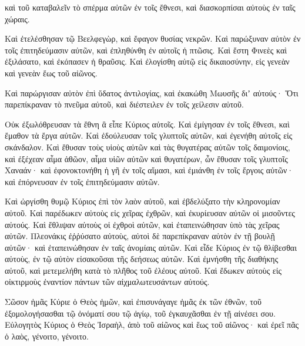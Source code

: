 {καὶ τοῦ καταβαλεῖν τὸ σπέρμα αὐτῶν ἐν τοῖς ἔθνεσι, καὶ διασκορπίσαι αὐτοὺς ἐν ταῖς χώραις.
\par }{\PP {}Καὶ ἐτελέσθησαν τῷ Βεελφεγὼρ, καὶ ἔφαγον θυσίας νεκρῶν.
Καὶ παρώξυναν αὐτὸν ἐν τοῖς ἐπιτηδεύμασιν αὐτῶν, καὶ ἐπληθύνθη ἐν αὐτοῖς ἡ πτῶσις.
Καὶ ἔστη Φινεὲς καὶ ἐξιλάσατο, καὶ ἐκόπασεν ἡ θραῦσις.
Καὶ ἐλογίσθη αὐτῷ εἰς δικαιοσύνην, εἰς γενεὰν καὶ γενεὰν ἕως τοῦ αἰῶνος.
\par }{\PP {}Καὶ παρώργισαν αὐτὸν ἐπὶ ὕδατος ἀντιλογίας, καὶ ἐκακώθη Μωυσῆς διʼ αὐτούς·
Ὅτι παρεπίκραναν τὸ πνεῦμα αὐτοῦ, καὶ διέστειλεν ἐν τοῖς χείλεσιν αὐτοῦ.
\par }{\PP {}Οὐκ ἐξωλόθρευσαν τὰ ἔθνη ἃ εἶπε Κύριος αὐτοῖς.
Καὶ ἐμίγησαν ἐν τοῖς ἔθνεσι, καὶ ἔμαθον τὰ ἔργα αὐτῶν.
Καὶ ἐδούλευσαν τοῖς γλυπτοῖς αὐτῶν, καὶ ἐγενήθη αὐτοῖς εἰς σκάνδαλον.
Καὶ ἔθυσαν τοὺς υἱοὺς αὐτῶν καὶ τὰς θυγατέρας αὐτῶν τοῖς δαιμονίοις,
καὶ ἐξέχεαν αἷμα ἀθῶον, αἷμα υἱῶν αὐτῶν καὶ θυγατέρων, ὧν ἔθυσαν τοῖς γλυπτοῖς Χαναάν· καὶ ἐφονοκτονήθη ἡ γῆ ἐν τοῖς αἵμασι,
καὶ ἐμιάνθη ἐν τοῖς ἔργοις αὐτῶν· καὶ ἐπόρνευσαν ἐν τοῖς ἐπιτηδεύμασιν αὐτῶν.
\par }{\PP {}Καὶ ὠργίσθη θυμῷ Κύριος ἐπὶ τὸν λαὸν αὐτοῦ, καὶ ἐβδελύξατο τὴν κληρονομίαν αὐτοῦ.
Καὶ παρέδωκεν αὐτοὺς εἰς χεῖρας ἐχθρῶν, καὶ ἐκυρίευσαν αὐτῶν οἱ μισοῦντες αὐτούς.
Καὶ ἔθλιψαν αὐτοὺς οἱ ἐχθροὶ αὐτῶν, καὶ ἐταπεινώθησαν ὑπὸ τὰς χεῖρας αὐτῶν.
Πλεονάκις ἐῤῥύσατο αὐτοὺς, αὐτοὶ δὲ παρεπίκραναν αὐτὸν ἐν τῇ βουλῇ αὐτῶν· καὶ ἐταπεινώθησαν ἐν ταῖς ἀνομίαις αὐτῶν.
Καὶ εἶδε Κύριος ἐν τῷ θλίβεσθαι αὐτοὺς, ἐν τῷ αὐτὸν εἰσακοῦσαι τῆς δεήσεως αὐτῶν.
Καὶ ἐμνήσθη τῆς διαθήκης αὐτοῦ, καὶ μετεμελήθη κατὰ τὸ πλῆθος τοῦ ἐλέους αὐτοῦ.
Καὶ ἔδωκεν αὐτοὺς εἰς οἰκτιρμοὺς ἐναντίον πάντων τῶν αἰχμαλωτευσάντων αὐτούς.
\par }{\PP {}Σῶσον ἡμᾶς Κύριε ὁ Θεὸς ἡμῶν, καὶ ἐπισυνάγαγε ἡμᾶς ἐκ τῶν ἐθνῶν, τοῦ ἐξομολογήσασθαι τῷ ὀνόματί σου τῷ ἁγίῳ, τοῦ ἐγκαυχᾶσθαι ἐν τῇ αἰνέσει σου.
Εὐλογητὸς Κύριος ὁ Θεὸς Ἰσραὴλ, ἀπὸ τοῦ αἰῶνος καὶ ἕως τοῦ αἰῶνος· καὶ ἐρεῖ πᾶς ὁ λαὸς, γένοιτο, γένοιτο.

}
